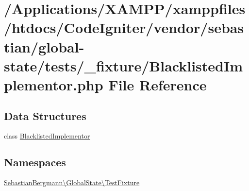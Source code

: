 \hypertarget{_blacklisted_implementor_8php}{}\section{/\+Applications/\+X\+A\+M\+P\+P/xamppfiles/htdocs/\+Code\+Igniter/vendor/sebastian/global-\/state/tests/\+\_\+fixture/\+Blacklisted\+Implementor.php File Reference}
\label{_blacklisted_implementor_8php}
\subsection*{Data Structures}
\begin{DoxyCompactItemize}
\item 
class \mbox{\hyperlink{class_sebastian_bergmann_1_1_global_state_1_1_test_fixture_1_1_blacklisted_implementor}{Blacklisted\+Implementor}}
\end{DoxyCompactItemize}
\subsection*{Namespaces}
\begin{DoxyCompactItemize}
\item 
 \mbox{\hyperlink{namespace_sebastian_bergmann_1_1_global_state_1_1_test_fixture}{Sebastian\+Bergmann\textbackslash{}\+Global\+State\textbackslash{}\+Test\+Fixture}}
\end{DoxyCompactItemize}
